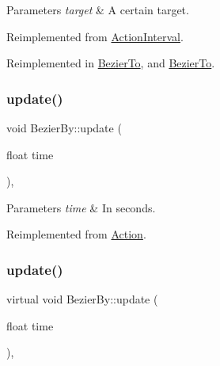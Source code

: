 \begin{DoxyParams}{Parameters}
{\em target} & A certain target. \\
\hline
\end{DoxyParams}


Reimplemented from \hyperlink{classActionInterval_ad3d91186b2c3108488ddbbdbbd982484}{Action\+Interval}.



Reimplemented in \hyperlink{classBezierTo_a0afa7e2b008c5d8f8a63d559face86a3}{Bezier\+To}, and \hyperlink{classBezierTo_ad45e47e3da2159e77c5b82fa1b6b2b1a}{Bezier\+To}.

\mbox{\label{classBezierBy_a99520417807192413ef4a3eca76682b8}} 
\subsubsection{\texorpdfstring{update()}{update()}\hspace{0.1cm}{\footnotesize\ttfamily [1/2]}}
{\footnotesize\ttfamily void Bezier\+By\+::update (\begin{DoxyParamCaption}\item[{float}]{time }\end{DoxyParamCaption})\hspace{0.3cm}{\ttfamily [override]}, {\ttfamily [virtual]}}


\begin{DoxyParams}{Parameters}
{\em time} & In seconds. \\
\hline
\end{DoxyParams}


Reimplemented from \hyperlink{classAction_a937e646e63915e33ad05ba149bfcf239}{Action}.

\mbox{\label{classBezierBy_a2f097a33bf957da1f466896735e3c094}} 
\subsubsection{\texorpdfstring{update()}{update()}\hspace{0.1cm}{\footnotesize\ttfamily [2/2]}}
{\footnotesize\ttfamily virtual void Bezier\+By\+::update (\begin{DoxyParamCaption}\item[{float}]{time }\end{DoxyParamCaption})\hspace{0.3cm}{\ttfamily [override]}, {\ttfamily [virtual]}}


